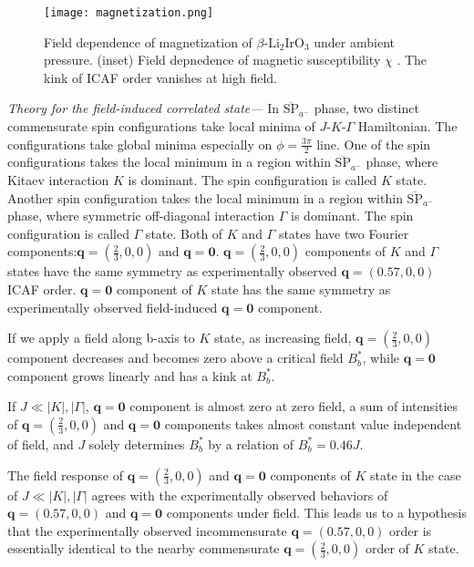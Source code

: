 \begin{figure}
  \centering
  \texttt{[image: magnetization.png]}
  \caption{Field dependence of magnetization of $\beta$-Li$_2$IrO$_3$ under ambient pressure.
  (inset) Field depnedence of magnetic susceptibility $\chi$ \cite{takayama2015hyperhoneycomb}.
  The kink of ICAF order vanishes at high field.}
  \label{Bdep_mag}
\end{figure}

\vspace{3mm}
\noindent\textit{Theory for the field-induced correlated state---} In $\overline{\mathrm{SP}}_{a^-}$ phase, two distinct commensurate spin configurations take local minima of $J$-$K$-$\Gamma$ Hamiltonian.
The configurations take global minima especially on $\phi = \frac{3\pi}{2}$ line.
One of the spin configurations takes the local minimum in a region within $\overline{\mathrm{SP}}_{a^-}$ phase, where Kitaev interaction $K$ is dominant.
The spin configuration is called $K$ state.
Another spin configuration takes the local minimum in a region within $\overline{\mathrm{SP}}_{a^-}$ phase, where symmetric off-diagonal interaction $\Gamma$ is dominant.
The spin configuration is called $\Gamma$ state.
Both of $K$ and $\Gamma$ states have two Fourier components:$\bm{q} = (\frac{2}{3}, 0, 0)$ and $\bm{q} = \bm{0}$.
$\bm{q} = (\frac{2}{3}, 0, 0)$ components of $K$ and $\Gamma$ states have the same symmetry as experimentally observed $\bm{q} = (0.57, 0, 0)$ ICAF order.
$\bm{q} = \bm{0}$ component of $K$ state has the same symmetry as experimentally observed field-induced $\bm{q} = \bm{0}$ component.

If we apply a field along b-axis to $K$ state, as increasing field, $\bm{q} = (\frac{2}{3}, 0, 0)$ component decreases and becomes zero above a critical field $B^*_b$, while $\bm{q} = \bm{0}$ component grows linearly and has a kink at $B^*_b$.

If $J \ll |K|, |\Gamma|$, $\bm{q} = \bm{0}$ component is almost zero at zero field, a sum of intensities of $\bm{q} = (\frac{2}{3}, 0, 0)$ and $\bm{q} = \bm{0}$ components takes almost constant value independent of field, and $J$ solely determines $B^*_b$ by a relation of $B^*_b = 0.46J$.

The field response of $\bm{q} = (\frac{2}{3}, 0, 0)$ and $\bm{q} = \bm{0}$ components of $K$ state in the case of $J \ll |K|, |\Gamma|$ agrees with the experimentally observed behaviors of $\bm{q} = (0.57, 0, 0)$ and $\bm{q} = \bm{0}$ components under field.
This leads us to a hypothesis that the experimentally observed incommensurate $\bm{q} = (0.57, 0, 0)$ order is essentially identical to the nearby commensurate $\bm{q} = (\frac{2}{3}, 0, 0)$ order of $K$ state.

